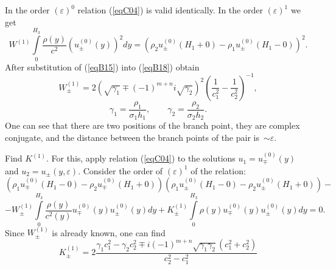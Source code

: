 \documentclass[12pt]{article}
\newcommand{\eps}{\varepsilon}
\begin{document}
In the order $(\eps)^0$ relation (\ref{eqC04}) is valid identically. In the order $(\eps)^1$
we get
\begin{equation}
W^{(1)} \int \limits_0^{H_3} \frac{\rho(y)}{c^2} \left( u_\pm^{(0)}(y) \right)^2 dy 
= 
\left( \rho_2 u_\pm^{(0)}(H_1 + 0) - \rho_1 u_\pm^{(0)}(H_1 - 0)\right)^2.
\label{eqB18}
\end{equation}
After substitution of (\ref{eqB15}) into (\ref{eqB18}) obtain
\begin{equation}
W^{(1)}_{\pm} = 2 \left( \sqrt{\gamma_1} \mp (-1)^{m+n} i \sqrt{\gamma_2} \right)^2
\left( 
\frac{1}{c_1^2}
-
\frac{1}{c_2^2}
\right)^{-1},
\label{eqB19}
\end{equation}
\begin{equation}
\gamma_1 = \frac{\rho_1}{\sigma_1 h_1},
\qquad
\gamma_2 = \frac{\rho_2}{\sigma_2 h_2}.
\label{eqB20}
\end{equation}
One can see that there are two positions of the branch point, they are complex conjugate, 
and the distance between the branch points of the pair is~$\sim \eps$.

Find $K^{(1)}$. For this, apply relation (\ref{eqC04}) to the solutions
$u_1 = u_\mp^{(0)}(y)$ and $u_2 = u_\pm(y , \eps)$. Consider the order of $(\eps)^1$ of the relation: 
\[
\left( 
\rho_1 u_\mp^{(0)} (H_1 - 0) - \rho_2 u_\mp^{(0)} (H_1 + 0)
\right)
\left( 
\rho_1 u_\pm^{(0)} (H_1 - 0) - \rho_2 u_\pm^{(0)} (H_1 + 0)
\right) -
\]
\begin{equation}
- W_\pm^{(1)} \int \limits_0^{H_3}
\frac{\rho(y)}{c^2(y)} u_\mp^{(0)}(y) u_\pm^{(0)}(y) dy + 
K_\pm^{(1)} \int \limits_0^{H_3}
\rho(y) u_\mp^{(0)}(y) u_\pm^{(0)}(y) dy =0. 
\label{eqB21}
\end{equation}
Since $W^{(1)}_\pm$ is already known, one can find 
\begin{equation}
K_\pm^{(1)} = 2 \frac{
\gamma_1 c_1^2 - \gamma_2 c_2^2 \mp i (-1)^{m+n} \sqrt{\gamma_1 \gamma_2} (c_1^2 + c_2^2) 
}{
c_2^2 - c_1^2
}
\label{eqB22}
\end{equation}



\end{document}
